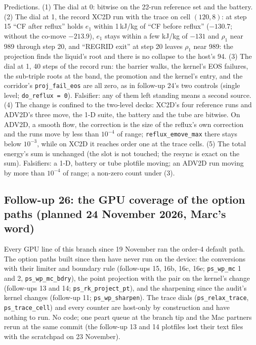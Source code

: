 \documentclass[11pt,a4paper]{article}
\newcommand{\code}[1]{\texttt{\small #1}}
\begin{document}
Predictions.  (1) The dial at 0: bitwise on the 22-run reference set
and the battery.  (2) The dial at 1, the record XC2D run with the
trace on cell $(120, 8)$: at step 15 ``CF after reflux'' holds $e_1$
within 1\,kJ/kg of ``CF before reflux'' ($-130.7$; without the co-move
$-213.9$), $e_1$ stays within a few kJ/kg of $-131$ and $\rho_1$ near
989 through step 20, and ``REGRID exit'' at step 20 leaves $\rho_1$ near
989: the projection finds the liquid's root and there is no collapse to
the host's 94.  (3) The dial at 1, 40 steps of the record run: the
barrier walks, the kernel's EOS failures, the sub-triple roots at the
band, the promotion and the kernel's entry, and the corridor's
\code{proj\_fail\_eos} are all zero, as in follow-up 24's two controls
(single level; \code{do\_reflux = 0}).  Falsifier: any of them left
standing means a second source.  (4) The change is confined to the
two-level decks: XC2D's four reference runs and ADV2D's three move,
the 1-D suite, the battery and the tube are bitwise.  On ADV2D, a
smooth flow, the correction is the size of the reflux's own
correction and the runs move by less than $10^{-4}$ of range;
\code{reflux\_emove\_max} there stays below $10^{-3}$, while on XC2D it
reaches order one at the trace cells.  (5) The total energy's sum is
unchanged (the slot is not touched; the resync is exact on the sum).
Falsifiers: a 1-D, battery or tube plotfile moving; an ADV2D run moving
by more than $10^{-4}$ of range; a non-zero count under (3).

\subsection*{Follow-up 26: the GPU coverage of the option paths (planned 24 November 2026, Marc's word)}
\label{sec:fu26-plan}

Every GPU line of this branch since 19 November ran the order-4 default
path.  The option paths built since then have never run on the device:
the conversions with their limiter and boundary rule (follow-ups 15,
16b, 16c, 16e; \code{ps\_wp\_mc} 1 and 2, \code{ps\_wp\_mc\_bdry}), the
point projection with the pair on the kernel's change (follow-ups 13
and 14; \code{ps\_rk\_project\_pt}), and the sharpening since the audit's
kernel changes (follow-up 11; \code{ps\_wp\_sharpen}).  The trace dials
(\code{ps\_relax\_trace}, \code{ps\_trace\_cell}) and every counter are
host-only by construction and have nothing to run.  No code; one peart
queue at the branch tip and the Mac partners rerun at the same commit
(the follow-up 13 and 14 plotfiles lost their text files with the
scratchpad on 23 November).
\end{document}

